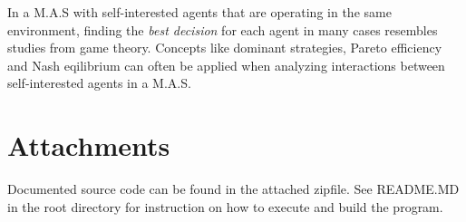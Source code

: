 \documentclass[a4paper, 11pt]{article}
\begin{document}
In a M.A.S with self-interested agents that are operating in the same environment, finding the  \textit{best decision} for each agent in many cases resembles studies from game theory. Concepts like dominant strategies, Pareto efficiency and Nash eqilibrium can often be applied when analyzing interactions between self-interested agents in a M.A.S.

\section*{Attachments}
Documented source code can be found in the attached zipfile. See README.MD in the root directory for instruction on how to execute and build the program.

{}

\end{document}
